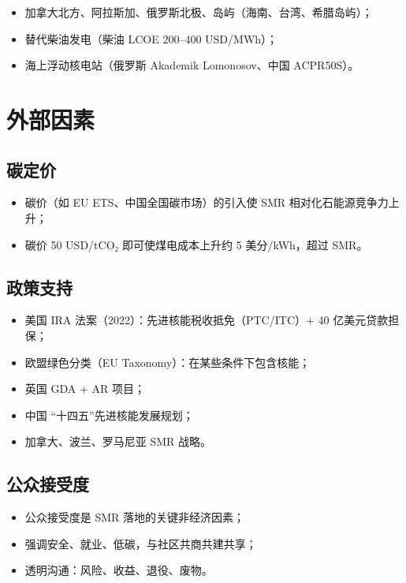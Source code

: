 \documentclass[
  UTF8,
  scheme=plain,
  fontsize=10pt,
  openany
]{ctexbook}
\begin{document}
\begin{itemize}
\tightlist
\item
  加拿大北方、阿拉斯加、俄罗斯北极、岛屿（海南、台湾、希腊岛屿）；
\item
  替代柴油发电（柴油 LCOE 200--400 USD/MWh）；
\item
  海上浮动核电站（俄罗斯 Akademik Lomonosov、中国 ACPR50S）。
\end{itemize}

\section{外部因素}\label{ux5916ux90e8ux56e0ux7d20}

\subsection{碳定价}\label{ux78b3ux5b9aux4ef7}

\begin{itemize}
\tightlist
\item
  碳价（如 EU ETS、中国全国碳市场）的引入使 SMR 相对化石能源竞争力上升；
\item
  碳价 50 USD/tCO₂ 即可使煤电成本上升约 5 美分/kWh，超过 SMR。
\end{itemize}

\subsection{政策支持}\label{ux653fux7b56ux652fux6301}

\begin{itemize}
\tightlist
\item
  美国 IRA 法案（2022）：先进核能税收抵免（PTC/ITC）+ 40
  亿美元贷款担保；
\item
  欧盟绿色分类（EU Taxonomy）：在某些条件下包含核能；
\item
  英国 GDA + AR 项目；
\item
  中国 ``十四五''先进核能发展规划；
\item
  加拿大、波兰、罗马尼亚 SMR 战略。
\end{itemize}

\subsection{公众接受度}\label{ux516cux4f17ux63a5ux53d7ux5ea6}

\begin{itemize}
\tightlist
\item
  公众接受度是 SMR 落地的关键非经济因素；
\item
  强调安全、就业、低碳，与社区共商共建共享；
\item
  透明沟通：风险、收益、退役、废物。
\end{itemize}
\end{document}

